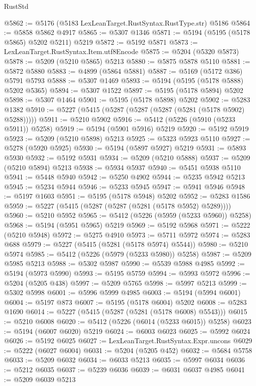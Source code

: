 \begin{lexlean}{RustStd}
\begin{coremodule}
@5862 := @5176 (@5183 LexLeanTarget.RustSyntax.RustType.str) @5186
@5864 := @5858 @5862 @4917
@5865 := @5307 @1346
@5871 := @5194 (@5195 (@5178 @5865) @5202 @5211) @5219
@5872 := @5192 @5871
@5873 := LexLeanTarget.RustSyntax.Item.utf8Encode
@5875 := @5204 (@5320 @5873)
@5878 := @5209 (@5210 @5865) @5213
@5880 := @5875 @5878 @5110
@5881 := @5872 @5880
@5883 := @4899 (@5864 @5881)
@5887 := @5169 (@5172 @386) @5791 @5793
@5888 := @5307 @1469
@5893 := @5194 (@5195 (@5178 @5888) @5202 @5365)
@5894 := @5307 @1522
@5897 := @5195 (@5178 @5894) @5202
@5898 := @5307 @1464
@5901 := @5195 (@5178 @5898) @5202
@5902 := @5283 @1382
@5910 := @5227 (@5415 (@5287 (@5287 (@5287 (@5281 (@5178 @5902) @5288)))))
@5911 := @5210 @5902
@5916 := @5412 (@5226 (@5910 (@5233 @5911)) @5258)
@5919 := @5194 (@5901 @5916) @5219
@5920 := @5192 @5919
@5923 := @5209 (@5210 @5898) @5213
@5925 := @5323 @5923 @5110
@5927 := @5278 (@5920 @5925)
@5930 := @5194 (@5897 @5927) @5219
@5931 := @5893 @5930
@5932 := @5192 @5931
@5934 := @5209 (@5210 @5888)
@5937 := @5209 (@5210 @5894) @5213
@5938 := @5934 @5937
@5940 := @5451 @5938 @5110
@5941 := @5448 @5940
@5942 := @5250 @4902
@5944 := @5235 @5942 @5213
@5945 := @5234 @5944
@5946 := @5233 @5945
@5947 := @5941 @5946
@5948 := @5197 @1603
@5951 := @5195 (@5178 @5948) @5202
@5952 := @5283 @1586
@5959 := @5227 (@5415 (@5287 (@5287 (@5281 (@5178 @5952) @5289))))
@5960 := @5210 @5952
@5965 := @5412 (@5226 (@5959 (@5233 @5960)) @5258)
@5968 := @5194 (@5951 @5965) @5219
@5969 := @5192 @5968
@5971 := @5222 (@5210 @5948)
@5972 := @5275 @4910
@5973 := @5711 @5972
@5974 := @5283 @688
@5979 := @5227 (@5415 (@5281 (@5178 @5974) @5544))
@5980 := @5210 @5974
@5985 := @5412 (@5226 (@5979 (@5233 @5980)) @5258)
@5987 := @5209 @5985 @5213
@5988 := @5302 @5987
@5990 := @5539 @5988 @4985
@5992 := @5194 (@5973 @5990)
@5993 := @5195 @5759
@5994 := @5993 @5972
@5996 := @5204 (@5205 @438)
@5997 := @5209 @5765
@5998 := @5997 @5213
@5999 := @5302 @5998
@6001 := @5996 @5999 @4985
@6003 := @5194 (@5994 @6001)
@6004 := @5197 @873
@6007 := @5195 (@5178 @6004) @5202
@6008 := @5283 @1690
@6014 := @5227 (@5415 (@5287 (@5281 (@5178 @6008) @5543)))
@6015 := @5210 @6008
@6020 := @5412 (@5226 (@6014 (@5233 @6015)) @5258)
@6023 := @5194 (@6007 @6020) @5219
@6024 := @6003 @6023
@6025 := @5992 @6024
@6026 := @5192 @6025
@6027 := LexLeanTarget.RustSyntax.Expr.uncons
@6029 := @5222 (@6027 @6004)
@6031 := @5204 (@5205 @452)
@6032 := @5684 @5758
@6033 := @5209 @6032
@6034 := @6033 @5213
@6035 := @5997 @6034
@6036 := @5212 @6035
@6037 := @5239 @6036
@6039 := @6031 @6037 @4985
@6041 := @5209 @6039 @5213

\end{coremodule}
\end{lexlean}
